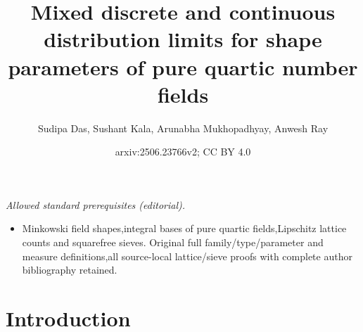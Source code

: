 \documentclass[table]{amsart}
\title{Mixed discrete and continuous distribution limits for shape parameters of pure quartic number fields}
\author{Sudipa Das, Sushant Kala, Arunabha Mukhopadhyay, Anwesh Ray}
\date{arxiv:2506.23766v2; CC BY 4.0}
\numberwithin{equation}{section}
\begin{document}
\maketitle
\noindent\textit{Allowed standard prerequisites (editorial).}\begin{itemize}
\item Minkowski field shapes,integral bases of pure quartic fields,Lipschitz lattice counts and squarefree sieves. Original full family/type/parameter and measure definitions,all source-local lattice/sieve proofs with complete author bibliography retained.
\end{itemize}\medskip
\section{Introduction}
\end{document}
